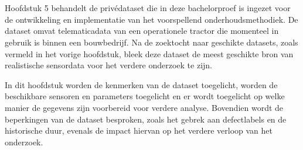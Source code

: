 
\chapter{}%
\label{ch:de echte data}

Hoofdstuk 5 behandelt de privédataset die in deze bachelorproef is ingezet voor de ontwikkeling en implementatie van het voorspellend onderhoudsmethodiek. De dataset omvat telematicadata van een operationele tractor die momenteel in gebruik is binnen een bouwbedrijf. Na de zoektocht naar geschikte datasets, zoals vermeld in het vorige hoofdstuk, bleek deze dataset de meest geschikte bron van realistische sensordata voor het verdere onderzoek te zijn.

In dit hoofdstuk worden de kenmerken van de dataset toegelicht, worden de beschikbare sensoren en parameters toegelicht en er wordt toegelicht op welke manier de gegevens zijn voorbereid voor verdere analyse. Bovendien wordt de beperkingen van de dataset besproken, zoals het gebrek aan defectlabels en de historische duur,  evenals de impact hiervan op het verdere verloop van het onderzoek.



